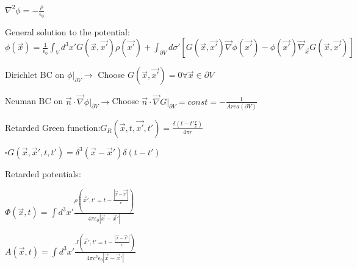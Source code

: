 \squishlist
\item $\nabla^2\phi=-\frac{\rho}{\epsilon_0}$

\item General solution to the potential:
$\phi(\vec{x})=\frac{1}{\epsilon_0}\int_Vd^3x'G(\vec{x},\vec{x'})\rho(\vec{x'})+\int_{\partial V}d\sigma'[G(\vec{x},\vec{x'})\vec{\nabla}\phi(\vec{x'}) - \phi(\vec{x'})\vec{\nabla}_{\vec{x}}G(\vec{x},\vec{x'})]$
\item Dirichlet BC on $\phi|_{\partial V} \rightarrow$ Choose $G(\vec{x},\vec{x'})=0 \forall \vec{x}\in\partial V$
\item Neuman BC on $\vec{n}\cdot\vec{\nabla}\phi|_{\partial V}\rightarrow$Choose $\vec{n}\cdot\vec{\nabla}G|_{\partial V}=const=-\frac{1}{Area(\partial V)}$
\squishend

\squishlist


    \item Retarded Green function:$G_R(\vec{x},t,\vec{x'},t')=\frac{\delta(t-t'\frac{r}{c})}{4\pi r} $
    
    \item $\square G(\vec{x},\vec{x}',t,t') = \delta^3(\vec{x}-\vec{x}')\delta(t-t')$
    \item Retarded potentials:
    \squishlist
        \item $\Phi (\vec{x},t) = \int d^3x' \frac{\rho\left(\vec{x}',t'=t-\frac{|\vec{x}-\vec{x'}|}{c}\right)}{4\pi \epsilon_0 |\vec{x}-\vec{x}'|}$
        \item $A(\vec{x},t) = \int d^3 x' \frac{J\left(\vec{x}',t'=t-\frac{|\vec{x}-\vec{x}'|}{c}\right)}{4\pi c^2 \epsilon_0 |\vec{x}-\vec{x}'|}$
    \squishend  
\squishend 

